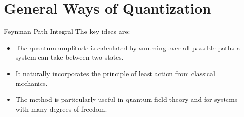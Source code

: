 \documentclass[12pt]{beamer}
\begin{document}
\section{General Ways of Quantization}
\begin{frame}{Feynman Path Integral}
The key ideas are:
\begin{itemize}
	\item The quantum amplitude is calculated by summing over all possible paths a system can take between two states.
	\item It naturally incorporates the principle of least action from classical mechanics.
	\item The method is particularly useful in quantum field theory and for systems with many degrees of freedom.
\end{itemize}
\end{frame}
\end{document}
